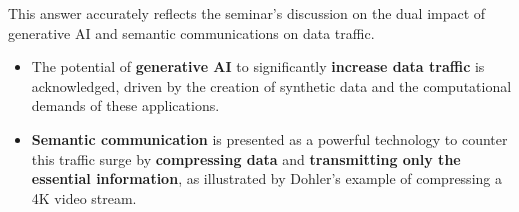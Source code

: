 \documentclass[
]{article}
\begin{document}
\begin{itemize}
  This answer accurately reflects the seminar's discussion on the dual
  impact of generative AI and semantic communications on data traffic.

  \begin{itemize}
  
  \item
    The potential of \textbf{generative AI} to significantly
    \textbf{increase data traffic} is acknowledged, driven by the
    creation of synthetic data and the computational demands of these
    applications.
  \item
    \textbf{Semantic communication} is presented as a powerful
    technology to counter this traffic surge by \textbf{compressing
    data} and \textbf{transmitting only the essential information}, as
    illustrated by Dohler's example of compressing a 4K video stream.
  \end{itemize}
\end{itemize}
\end{document}
